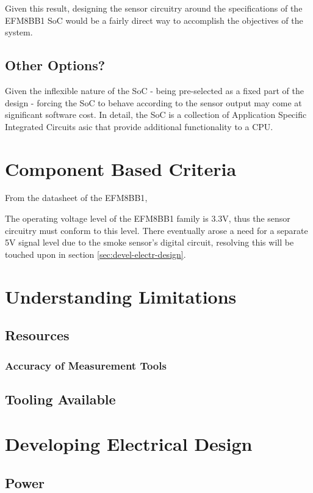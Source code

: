 \documentclass[12pt]{article}
\begin{document}
  Given this result, designing the sensor circuitry around the specifications of the EFM8BB1 SoC would be a fairly direct way to accomplish the objectives of the system.

  \subsection{Other Options?}
  Given the inflexible nature of the SoC - being pre-selected as a fixed part of the design - forcing the SoC to behave according to the sensor output may come at significant software cost. In detail, the SoC is a collection of Application Specific Integrated Circuits \acrshort{asic} that provide additional functionality to a CPU.

  \section{Component Based Criteria}

  From the datasheet of the EFM8BB1\cite{silabs:efm8bb1},

  The operating voltage level of the EFM8BB1 family is 3.3V, thus the sensor circuitry must conform to this level. There eventually arose a need for a separate 5V signal level due to the smoke sensor's digital circuit, resolving this will be touched upon in section \ref{sec:devel-electr-design}.

	\section{Understanding Limitations}
	\subsection{Resources}
  \subsubsection{Accuracy of Measurement Tools}
	\subsection{Tooling Available}
	
	
	
	\section{Developing Electrical Design\label{sec:devel-electr-design}} 
	\subsection{Power}
  
\end{document}
